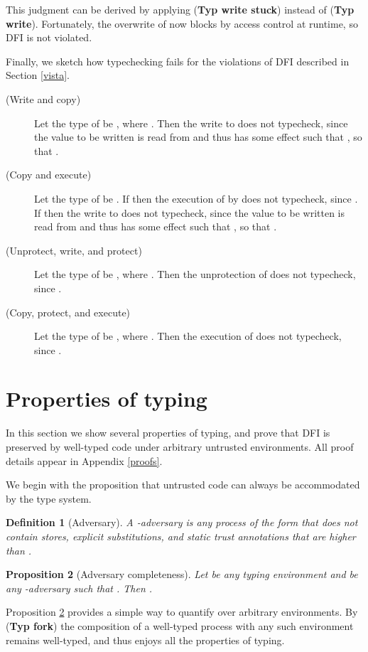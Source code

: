 \documentclass{sigplanconf}
\newcommand{\trule}[1]{(\textbf{Typ #1})}
\newtheorem{definition}{Definition}[section]
\newtheorem{proposition}[definition]{Proposition}
\begin{document}
This judgment can be derived by applying \trule{write stuck} instead of \trule{write}. Fortunately, the overwrite of  now blocks by access control at runtime, so DFI is not violated. 









Finally, we sketch how typechecking fails for the violations of DFI described in Section \ref{vista}. \begin{description}
\item[{\rm (}Write and copy{\rm )}]


  Let the type of  be , where . 
  Then the write to  does not typecheck, since the value to be written is read from  and thus has some effect  such that , so that .
\item[{\rm (}Copy and execute{\rm )}]


  Let the type of  be . 
  If  then the execution of  by  does not typecheck, since . 
  If  then the write to  does not typecheck, since the value to be written is read from  and thus has some effect  such that , so that .
\item[{\rm (}Unprotect, write, and protect{\rm )}]

  Let the type of  be , where . 
  Then the unprotection of  does not typecheck, since .  
\item[{\rm (}Copy, protect, and execute{\rm )}]

  Let the type of  be , where . 
  Then the execution of  does not typecheck, since .
\end{description}



\section{Properties of typing}\label{Results}
In
this section we show several properties of typing, and prove that DFI is preserved by well-typed code under arbitrary untrusted
environments. All proof details appear in Appendix \ref{proofs}.



We begin with the proposition that untrusted code can always be accommodated by
the type system. 
\begin{definition}[Adversary] A -adversary is any process of the form  that does not contain stores, explicit substitu\-tions, and static trust annotations that are higher than .
\end{definition}
\begin{proposition}[Adversary completeness]\label{advtyp} Let
   be any typing environment and  be any -adversary such that .
Then .
\end{proposition}
Proposition \ref{advtyp} provides a simple way to quantify over arbitrary environments. By \trule{fork} the composition of a well-typed process with any such environment remains well-typed, and thus enjoys all the properties of typing. 
\end{document}
